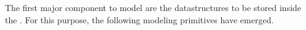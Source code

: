 %
%
%
The first major component to model are the datastructures to be stored inside the \db.
For this purpose, the following modeling primitives have emerged.%
%
%
%
%
%
\endhsection%
%
